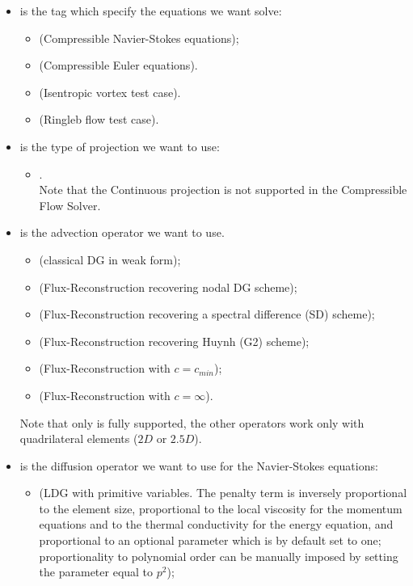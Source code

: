 \begin{itemize}
\item {} is the tag which specify the equations we want solve:
\begin{itemize}
\item {} (Compressible Navier-Stokes equations);
\item {} (Compressible Euler equations).
\item {} (Isentropic vortex test case).
\item {} (Ringleb flow test case).
\end{itemize}
\item {} is the type of projection we want to use:
\begin{itemize}
\item {}.\\
Note that the Continuous projection is not supported in the Compressible Flow Solver.
\end{itemize}
\item {} is the advection operator we want to use.
\begin{itemize}
\item {} (classical DG in weak form);
\item {} (Flux-Reconstruction recovering nodal DG scheme);
\item {} (Flux-Reconstruction recovering a spectral difference (SD) scheme);
\item {} (Flux-Reconstruction recovering Huynh (G2) scheme);
\item {} (Flux-Reconstruction with $c = c_{min}$);
\item {} (Flux-Reconstruction with $c = \infty$).
\end{itemize}
Note that only  is fully supported, the other operators work only with quadrilateral elements ($2D$ or $2.5D$).
\item {} is the diffusion operator we want to use
for the Navier-Stokes equations:
\begin{itemize}
\item {} (LDG with primitive variables. The penalty term is inversely proportional to the element size, proportional to the local viscosity for the momentum equations and to the thermal conductivity for the energy equation, and proportional to an optional parameter  which is by default set to one; proportionality to polynomial order can be manually imposed by setting the parameter  equal to $p^2$);

\end{itemize}
\end{itemize}
